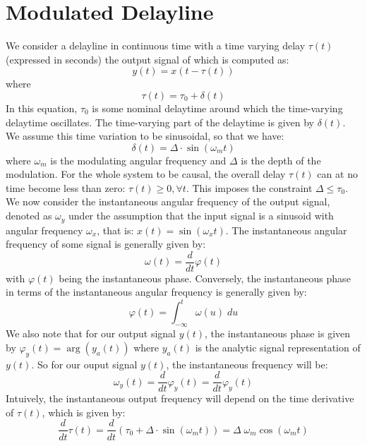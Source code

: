 \section{Modulated Delayline}
We consider a delayline in  continuous time with a time varying delay $\tau(t)$ (expressed in seconds) the output signal of which is computed as:
\begin{equation}
 y(t) = x(t - \tau(t))
\end{equation}
where
\begin{equation}
 \tau(t) = \tau_0 + \delta(t)
\end{equation}
In this equation, $\tau_0$ is some nominal delaytime around which the time-varying delaytime oscillates. The time-varying part of the delaytime is given by $\delta(t)$. We assume this time variation to be sinusoidal, so that we have:
\begin{equation}
 \delta(t) = \Delta \cdot \sin(\omega_m t)
\end{equation}
where $\omega_m$ is the modulating angular frequency and $\Delta$ is the depth of the modulation. For the whole system to be causal, the overall delay $\tau(t)$ can at no time become less than zero: $\tau(t) \geq 0, \forall t$. This imposes the constraint $\Delta \leq \tau_0$. We now consider the instantaneous angular frequency of the output signal, denoted as $\omega_y$ under the assumption that the input signal is a sinusoid with angular frequency $\omega_x$, that is: $x(t) = \sin(\omega_x t)$. The instantaneous angular frequency of some signal is generally given by:
\begin{equation}
 \omega(t) = \frac{d}{dt} \varphi(t)
\end{equation}
with $\varphi(t)$ being the instantaneous phase. Conversely, the instantaneous phase in terms of the instantaneous angular frequency is generally given by:
\begin{equation}
  \varphi(t)= \int_{-\infty}^{t} \omega(u) \; du
\end{equation}
We also note that for our output signal $y(t)$, the instantaneous phase is given by $\varphi_y(t) = \arg(y_a(t))$ where $y_a(t)$ is the analytic signal representation of $y(t)$. So for our ouput signal $y(t)$, the instantaneous frequency will be:
\begin{equation}
 \omega_y(t) = \frac{d}{dt} \varphi_y(t) = \frac{d}{dt} \varphi_y(t)
\end{equation}
Intuively, the instantaneous output frequency will depend on the time derivative of $\tau(t)$, which is given by:
\begin{equation}
 \frac{d}{dt} \tau(t) = \frac{d}{dt} ( \tau_0 + \Delta \cdot \sin(\omega_m t) )
 = \Delta \; \omega_m \cos(\omega_m t)
\end{equation}



